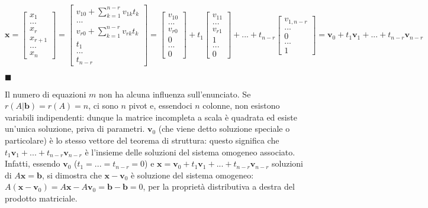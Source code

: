 \documentclass{article}
\begin{document}
\begin{equation*}
\mathbf{x=}\left[ 
\begin{array}{c}
x_{1} \\ 
... \\ 
x_{r} \\ 
x_{r+1} \\ 
... \\ 
x_{n}%
\end{array}%
\right] =\left[ 
\begin{array}{c}
v_{10}+\sum_{k=1}^{n-r}v_{1k}t_{k} \\ 
... \\ 
v_{r0}+\sum_{k=1}^{n-r}v_{rk}t_{k} \\ 
t_{1} \\ 
... \\ 
t_{n-r}%
\end{array}%
\right] =\left[ 
\begin{array}{c}
v_{10} \\ 
... \\ 
v_{r0} \\ 
0 \\ 
... \\ 
0%
\end{array}%
\right] +t_{1}\left[ 
\begin{array}{c}
v_{11} \\ 
... \\ 
v_{r1} \\ 
1 \\ 
... \\ 
0%
\end{array}%
\right] +...+t_{n-r}\left[ 
\begin{array}{c}
v_{1,n-r} \\ 
... \\ 
0 \\ 
... \\ 
1%
\end{array}%
\right] =\mathbf{v}_{0}+t_{1}\mathbf{v}_{1}+...+t_{n-r}\mathbf{v}_{n-r}
\end{equation*}

$\blacksquare $

Il numero di equazioni $m$ non ha alcuna influenza sull'enunciato. Se $%
r\left( A|\mathbf{b}\right) =r\left( A\right) =n$, ci sono $n$ pivot e,
essendoci $n$ colonne, non esistono variabili indipendenti: dunque la
matrice incompleta a scala \`{e} quadrata ed esiste un'unica soluzione,
priva di parametri. $\mathbf{v}_{0}$ (che viene detto soluzione speciale o
particolare) \`{e} lo stesso vettore del teorema di struttura: questo
significa che $t_{1}\mathbf{v}_{1}+...+t_{n-r}\mathbf{v}_{n-r}$ \`{e}
l'insieme delle soluzioni del sistema omogeneo associato. Infatti, essendo $%
\mathbf{v}_{0}$ ($t_{1}=...=t_{n-r}=0$) e $\mathbf{x}=\mathbf{v}_{0}+t_{1}%
\mathbf{v}_{1}+...+t_{n-r}\mathbf{v}_{n-r}$ soluzioni di $A\mathbf{x=b}$, si
dimostra che $\mathbf{x-v}_{0}$ \`{e} soluzione del sistema omogeneo: $%
A\left( \mathbf{x}-\mathbf{v}_{0}\right) =A\mathbf{x-}A\mathbf{v}_{0}=%
\mathbf{b-b}=0$, per la propriet\`{a} distributiva a destra del prodotto
matriciale.
\end{document}
